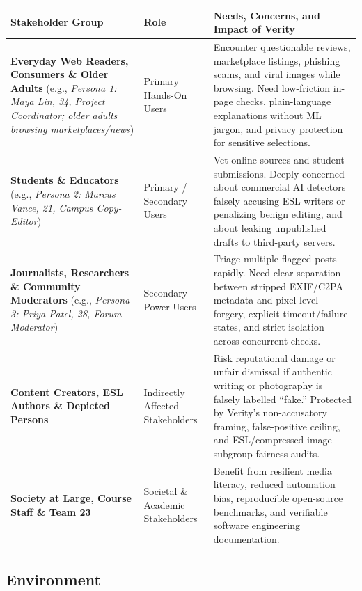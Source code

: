 \documentclass[11pt]{article}
\begin{document}
\begin{tabularx}{\textwidth}{P{3.4cm} P{3.2cm} Y}
\caption{Stakeholder Analysis and Real-World Impact} \label{TblStakeholders}\\
\toprule
\textbf{Stakeholder Group} & \textbf{Role} & \textbf{Needs, Concerns, and Impact of Verity}\\
\midrule
\textbf{Everyday Web Readers, Consumers \& Older Adults} (e.g., \emph{Persona 1: Maya Lin, 34, Project Coordinator; older adults browsing marketplaces/news}) & Primary Hands-On Users & Encounter questionable reviews, marketplace listings, phishing scams, and viral images while browsing. Need low-friction in-page checks, plain-language explanations without ML jargon, and privacy protection for sensitive selections.\\
\addlinespace
\textbf{Students \& Educators} (e.g., \emph{Persona 2: Marcus Vance, 21, Campus Copy-Editor}) & Primary / Secondary Users & Vet online sources and student submissions. Deeply concerned about commercial AI detectors falsely accusing ESL writers or penalizing benign editing, and about leaking unpublished drafts to third-party servers.\\
\addlinespace
\textbf{Journalists, Researchers \& Community Moderators} (e.g., \emph{Persona 3: Priya Patel, 28, Forum Moderator}) & Secondary Power Users & Triage multiple flagged posts rapidly. Need clear separation between stripped EXIF/C2PA metadata and pixel-level forgery, explicit timeout/failure states, and strict isolation across concurrent checks.\\
\addlinespace
\textbf{Content Creators, ESL Authors \& Depicted Persons} & Indirectly Affected Stakeholders & Risk reputational damage or unfair dismissal if authentic writing or photography is falsely labelled ``fake.'' Protected by Verity's non-accusatory framing, false-positive ceiling, and ESL/compressed-image subgroup fairness audits.\\
\addlinespace
\textbf{Society at Large, Course Staff \& Team 23} & Societal \& Academic Stakeholders & Benefit from resilient media literacy, reduced automation bias, reproducible open-source benchmarks, and verifiable software engineering documentation.\\
\bottomrule
\end{tabularx}

\subsection{Environment}
\end{document}
